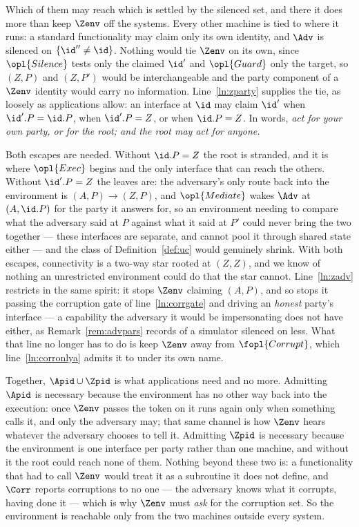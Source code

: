 \documentclass[10pt,oneside,openany]{book}
\theoremstyle{accentdef}
\theoremstyle{accentplain}
\begin{document}
Which of them may reach which is settled by the silenced set, and there it does more than keep
$\Zenv$ off the systems. Every other machine is tied to where it runs: a standard functionality may
claim only its own identity, and $\Adv$ is silenced on $\{\id'' \neq \id\}$. Nothing would tie
$\Zenv$ on its own, since $\opl{Silence}$ tests only the claimed $\id'$ and $\opl{Guard}$ only the
target, so $(Z,P)$ and $(Z,P')$ would be interchangeable and the party component of a $\Zenv$
identity would carry no information. Line~\ref{ln:zparty} supplies the tie, as loosely as
applications allow: an interface at $\id$ may claim $\id'$ when
$\id'.P = \id.P$, when $\id'.P = Z$, or when $\id.P = Z$. In words, \emph{act for your own party,
or for the root; and the root may act for anyone.}

Both escapes are needed. Without $\id.P = Z$ the root is stranded, and it is where $\opl{Exec}$
begins and the only interface that can reach the others. Without $\id'.P = Z$ the leaves are: the
adversary's only route back into the environment is $(A,P) \to (Z,P)$, and $\opl{Mediate}$ wakes
$\Adv$ at $(A,\id.P)$ for the party it answers for, so an environment needing to compare what the
adversary said at $P$ against what it said at $P'$ could never bring the two together --- these
interfaces are separate, and cannot pool it through shared state either --- and the class of
Definition~\ref{def:uc} would genuinely shrink. With both escapes, connectivity is a two-way star
rooted at $(Z,Z)$, and we know of nothing an unrestricted environment could do that the star
cannot.
Line~\ref{ln:zadv} restricts in the same spirit: it stops $\Zenv$ claiming $(A,P)$, and so stops it
passing the corruption gate of line~\ref{ln:corrgate} and driving an \emph{honest} party's interface ---
a capability the adversary it would be impersonating does not have either, as
Remark~\ref{rem:advpars} records of a simulator silenced on less. What that line no longer has to do
is keep $\Zenv$ away from $\fopl{Corrupt}$, which line~\ref{ln:corronlya} admits it to under its own
name.

Together, $\Apid \cup \Zpid$ is what applications need and no more. Admitting $\Apid$ is necessary because
the environment has no other way back into the execution: once $\Zenv$ passes the token on it runs
again only when something calls it, and only the adversary may; that same channel is how $\Zenv$
hears whatever the adversary chooses to tell it. Admitting $\Zpid$ is necessary because the environment is
one interface per party rather than one machine, and without it the root could reach none of them.
Nothing beyond these two is: a functionality that had to call $\Zenv$ would treat it as a
subroutine it does not define, and $\Corr$ reports corruptions to no one --- the adversary knows
what it corrupts, having done it --- which is why $\Zenv$ must \emph{ask} for the corruption set. So the environment is reachable only
from the two machines outside every system.
\end{document}
